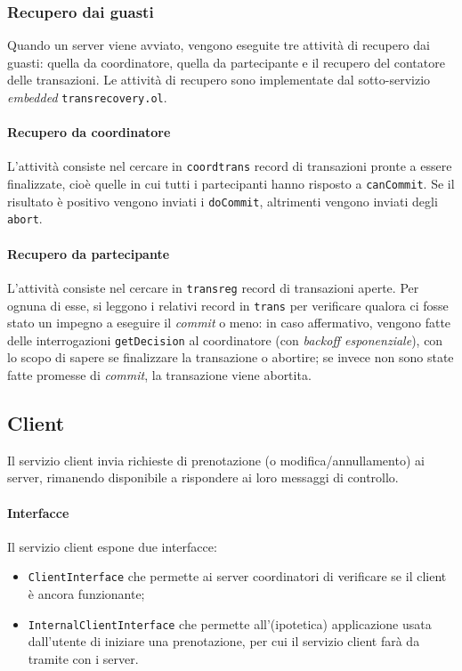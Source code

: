 \documentclass[a4paper]{article}
\begin{document}
\subsubsection{Recupero dai guasti}

Quando un server viene avviato, vengono eseguite tre attività di recupero dai guasti: quella da coordinatore, quella da partecipante e il recupero del contatore delle transazioni. Le attività di recupero sono implementate dal sotto-servizio \textit{embedded} \texttt{transrecovery.ol}.

\paragraph{Recupero da coordinatore} L'attività consiste nel cercare in \texttt{coordtrans} record di transazioni pronte a essere finalizzate, cioè quelle in cui tutti i partecipanti hanno risposto a \texttt{canCommit}. Se il risultato è positivo vengono inviati i \texttt{doCommit}, altrimenti vengono inviati degli \texttt{abort}.

\paragraph{Recupero da partecipante} L'attività consiste nel cercare in \texttt{transreg} record di transazioni aperte. Per ognuna di esse, si leggono i relativi record in \texttt{trans} per verificare qualora ci fosse stato un impegno a eseguire il \textit{commit} o meno: in caso affermativo, vengono fatte delle interrogazioni \texttt{getDecision} al coordinatore (con \textit{backoff esponenziale}), con lo scopo di sapere se finalizzare la transazione o abortire; se invece non sono state fatte promesse di \textit{commit}, la transazione viene abortita.

\subsection{Client}
Il servizio client invia richieste di prenotazione (o modifica/annullamento) ai server, rimanendo disponibile a rispondere ai loro messaggi di controllo.

\paragraph{Interfacce} Il servizio client espone due interfacce:
\begin{itemize}
	\item \texttt{ClientInterface} che permette ai server coordinatori di verificare se il client è ancora funzionante;
	\item \texttt{InternalClientInterface} che permette all'(ipotetica) applicazione usata dall'utente di iniziare una prenotazione, per cui il servizio client farà da tramite con i server. 
\end{itemize}
\end{document}
